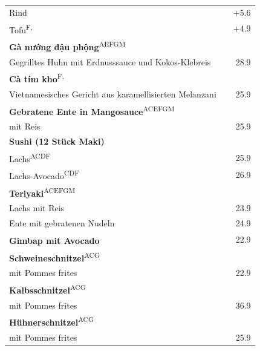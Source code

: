 \documentclass[a4paper,12pt]{article}
\newcommand{\vegan}{\textbf{\scriptsize \color{vegan}{Vegan}}}
\begin{document}
\begin{multicols}{2}
\begin{tabular}{Lrr}
\hspace{0.4cm}Rind & & +5.6\\
\hspace{0.4cm}Tofu\textsuperscript{{\scriptsize F, \vegan}} & & +4.9\\
\textbf{Gà nướng đậu phộng}\textsuperscript{{\scriptsize AEFGM}}\\
\hspace{0.4cm}\scriptsize Gegrilltes Huhn mit Erdnusssauce und Kokos-Klebreis & & 28.9\\
\textbf{Cà tím kho}\textsuperscript{{\scriptsize F, \vegan}}\\
\hspace{0.4cm}\scriptsize Vietnamesisches Gericht aus karamellisierten Melanzani & & 25.9\\
\textbf{Gebratene Ente in Mangosauce}\textsuperscript{{\scriptsize ACEFGM}}\\
\hspace{0.4cm}\scriptsize mit Reis & & 25.9\\
\textbf{Sushi (12 Stück Maki)}\\
\hspace{0.4cm}Lachs\textsuperscript{{\scriptsize ACDF}} & & 25.9\\
\hspace{0.4cm}Lachs-Avocado\textsuperscript{{\scriptsize CDF}} & & 26.9\\
\textbf{Teriyaki}\textsuperscript{{\scriptsize ACEFGM}}\\
\hspace{0.4cm}Lachs mit Reis & & 23.9\\
\hspace{0.4cm}Ente mit gebratenen Nudeln & & 24.9\\
\textbf{Gimbap mit Avocado}\textsuperscript{{\scriptsize \vegan}} & & 22.9\\
\textbf{Schweineschnitzel}\textsuperscript{{\scriptsize ACG}}\\
\hspace{0.4cm}\scriptsize  mit Pommes frites & & 22.9\\
\textbf{Kalbsschnitzel}\textsuperscript{{\scriptsize ACG}}\\
\hspace{0.4cm}\scriptsize  mit Pommes frites & & 36.9\\
\textbf{Hühnerschnitzel}\textsuperscript{{\scriptsize ACG}}\\
\hspace{0.4cm}\scriptsize  mit Pommes frites & & 25.9
\end{tabular}

\end{multicols}
\end{document}

